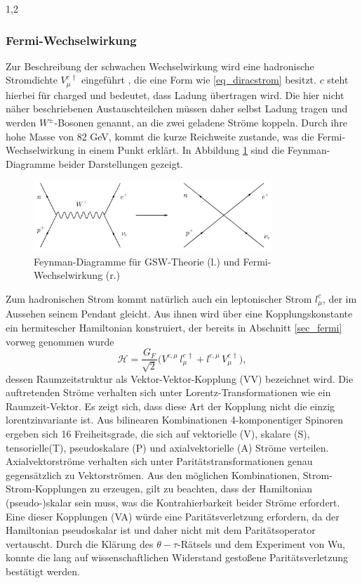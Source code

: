 \documentclass[11pt,a4paper,twoside]{report}
\begin{document}
\begin{spacing}{1,2}
\subsubsection{Fermi-Wechselwirkung}
\label{sec_fermiWW}
Zur Beschreibung der schwachen Wechselwirkung wird eine hadronische Stromdichte $V_\mu^{c\,\dagger}$ eingeführt \cite{Klapdor}, die eine Form wie 
\eqref{eq_diracstrom} besitzt. 
$c$ steht hierbei für charged und bedeutet, dass Ladung
übertragen wird. Die hier nicht näher beschriebenen Austauschteilchen müssen daher selbst Ladung tragen und werden $W^\pm$-Bosonen genannt, an die zwei 
geladene Ströme koppeln. Durch ihre hohe Masse von 82 GeV, kommt die kurze Reichweite zustande, was die Fermi-Wechselwirkung in einem Punkt erklärt. In
Abbildung \ref{pic_4fermi} sind die Feynman-Diagramme beider Darstellungen gezeigt.
\begin{figure}[H]
\includegraphics[width=0.8\textwidth]{Abbildungen/4fermi.jpg}
\caption{Feynman-Diagramme für GSW-Theorie (l.) und Fermi-Wechselwirkung (r.)}
\label{pic_4fermi}
\end{figure}
Zum hadronischen Strom kommt natürlich auch ein leptonischer Strom $l_\mu^c$, der im Aussehen seinem Pendant gleicht. Aus ihnen wird über eine Kopplungskonstante
ein hermitescher Hamiltonian konstruiert, der bereits in Abschnitt \ref{sec_fermi} vorweg genommen wurde
\begin{equation}
 \mathcal{H} = \frac{G_F}{\sqrt{2}}\big(V^{c,\mu}\,l_\mu^{c\,\dagger} + l^{c,\mu}\,V_\mu^{c\,\dagger}\big),
\end{equation}
dessen Raumzeitstruktur als Vektor-Vektor-Kopplung (VV) bezeichnet wird. Die auftretenden Ströme verhalten sich unter Lorentz-Transformationen wie ein Raumzeit-Vektor.
Es zeigt sich, dass diese Art der Kopplung nicht die einzig lorentzinvariante ist. Aus bilinearen Kombinationen 4-komponentiger Spinoren ergeben sich 16 Freiheitsgrade,
die sich auf vektorielle (V), skalare (S), tensorielle(T), pseudoskalare (P) und axialvektorielle (A) Ströme verteilen. Axialvektorströme verhalten sich unter
Paritätstransformationen genau gegensätzlich zu Vektorströmen. Aus den möglichen Kombinationen, Strom-Strom-Kopplungen zu erzeugen, gilt zu beachten, dass
der Hamiltonian (pseudo-)skalar sein muss, was die Kontrahierbarkeit beider Ströme erfordert. Eine dieser Kopplungen (VA) würde eine Paritätsverletzung erfordern,
da der Hamiltonian pseudoskalar ist und daher nicht mit dem Paritätsoperator vertauscht. Durch die Klärung des $\theta-\tau$-Rätsels und dem Experiment von Wu,
konnte die lang auf wissenschaftlichen Widerstand gestoßene Paritätsverletzung bestätigt werden.


\end{spacing}
\end{document}
